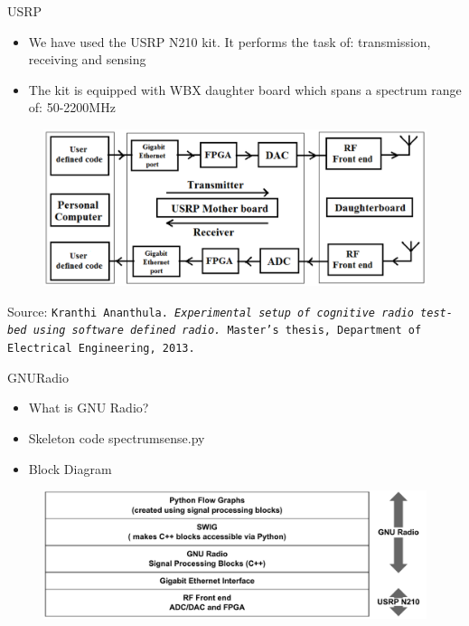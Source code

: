 \documentclass{beamer}
\begin{document}
  \begin{frame}{USRP}
    \begin{minipage}[t][0.8\textheight][t]{\textwidth}
      \begin{itemize}
	\item We have used the USRP N210 kit. It performs the task of: transmission, receiving and sensing
	\item The kit is equipped with WBX daughter board which spans a spectrum range of: 50-2200MHz
      \end{itemize}
      \begin{figure}
	\centering
	\includegraphics[width=\linewidth]{img/usrpBlock}
      \end{figure}
      \vfill
      \tiny{Source: \texttt{Kranthi Ananthula. \emph{Experimental setup of cognitive radio test-bed using software
defined radio.} Master's thesis, Department of Electrical Engineering, 2013.}}
   \end{minipage}
  \end{frame}
  
  \begin{frame}{GNURadio}
    \begin{minipage}[t][0.8\textheight][t]{\textwidth}
      \begin{itemize}
	  \item What is GNU Radio?
	  \item Skeleton code spectrumsense.py
	  \item Block Diagram
      \end{itemize}
      \begin{figure}
	\centering
	\includegraphics[width=\linewidth]{img/gnuradio_architecture}
      \end{figure}
   \end{minipage}
  \end{frame}
\end{document}

